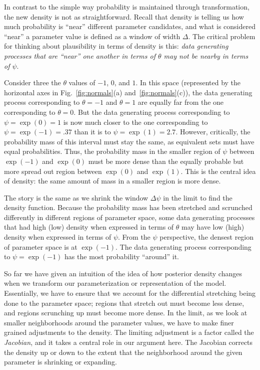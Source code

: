 \documentclass[9pt,twocolumn,twoside]{cidlab-draft}\templatetype{cidlab-invited}
\begin{document}
In contrast to the simple way probability is maintained through transformation, the new density is not as straightforward.  Recall that density is telling us how much probability is ``near'' different parameter candidates, and what is considered ``near'' a parameter value is defined as a window of width $\Delta$.  The critical problem for thinking about plausibility in terms of density is this: \textit{data generating processes that are ``near'' one another in terms of $\theta$ may not be nearby in terms of $\psi$}. 

Consider three the $\theta$ values of $-1$, $0$, and $1$. In this space (represented by the horizontal axes in Fig.~\ref{fig:normals}(a) and~\ref{fig:normals}(c)), the data generating process corresponding to $\theta=-1$ and $\theta=1$ are equally far from the one corresponding to $\theta=0$.  But the data generating process corresponding to $\psi=\exp{(0)}=1$ is now much closer to the one corresponding to $\psi=\exp{(-1)} = .37$ than it is to $\psi=\exp{(1)}= 2.7$.  However, critically, the probability mass of this interval must stay the same, as equivalent sets must have equal probabilities. Thus, the probability mass in the smaller region of $\psi$ between $\exp{(-1)}$ and $\exp{(0)}$ must be more dense than the equally probable but more spread out region between $\exp{(0)}$ and $\exp{(1)}$. This is the central idea of density: the same amount of mass in a smaller region is more dense. 

The story is the same as we shrink the window $\Delta\psi$ in the limit to find the density function. Because the probability mass has been stretched and scrunched differently in different regions of parameter space, some data generating processes that had high (low) density when expressed in terms of $\theta$ may have low (high) density when expressed in terms of $\psi$.  From the $\psi$ perspective, the densest region of parameter space is at $\exp{(-1)}$. The data generating process corresponding to $\psi=\exp{(-1)}$ has the most probability ``around'' it. 

So far we have given an intuition of the idea of how posterior density changes when we transform our parameterization or representation of the model. Essentially, we have to ensure that we account for the differential stretching being done to the parameter space; regions that stretch out must become less dense, and regions scrunching up must become more dense.  In the limit, as we look at smaller neighborhoods around the parameter values, we have to make finer grained adjustments to the density. The limiting adjustment is a factor called the \textit{Jacobian}, and it takes a central role in our argument here.  The Jacobian corrects the density up or down to the extent that the neighborhood around the given parameter is shrinking or expanding. 
\end{document}

